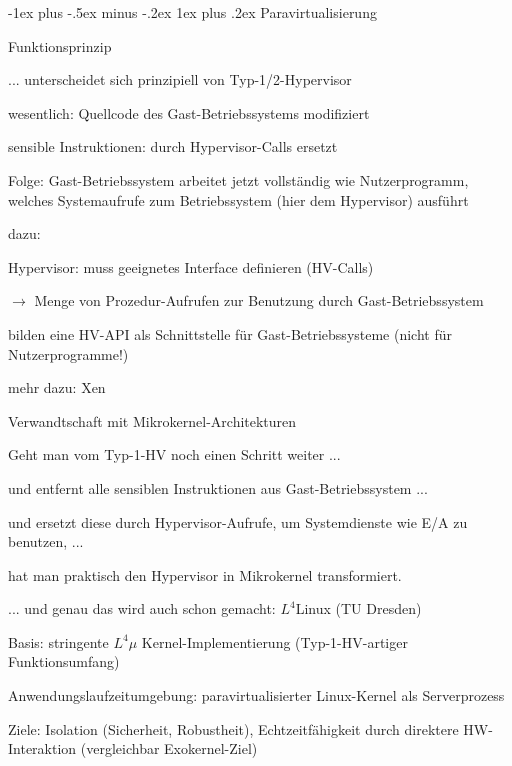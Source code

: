 \documentclass[a4paper]{article}
\makeatletter
\renewcommand{\subsubsection}{\@startsection{subsubsection}{3}{0mm}%
 {-1ex plus -.5ex minus -.2ex}%
 {1ex plus .2ex}%
 {\normalfont\small\bfseries}}
\makeatother
\begin{document}
\begin{multicols}{3}
    \subsubsection{Paravirtualisierung}

    Funktionsprinzip

    \begin{itemize*}
        \item
        ... unterscheidet sich prinzipiell von Typ-1/2-Hypervisor
        \item
        wesentlich: Quellcode des Gast-Betriebssystems modifiziert
        \item
        sensible Instruktionen: durch Hypervisor-Calls ersetzt
        \item
        Folge: Gast-Betriebssystem arbeitet jetzt vollständig wie
        Nutzerprogramm, welches Systemaufrufe zum Betriebssystem (hier dem
        Hypervisor) ausführt
        \item
        dazu:
        \begin{itemize*}
            \item Hypervisor: muss geeignetes Interface definieren (HV-Calls)
            \item[$\rightarrow$] Menge von Prozedur-Aufrufen zur Benutzung durch Gast-Betriebssystem
            \item bilden eine HV-API als Schnittstelle für Gast-Betriebssysteme (nicht für Nutzerprogramme!)
        \end{itemize*}
        \item
        mehr dazu: Xen
    \end{itemize*}

    Verwandtschaft mit Mikrokernel-Architekturen

    \begin{itemize*}
        \item
        Geht man vom Typ-1-HV noch einen Schritt weiter ...
        \begin{itemize*}
            \item und entfernt alle sensiblen Instruktionen aus Gast-Betriebssystem ...
            \item und ersetzt diese durch Hypervisor-Aufrufe, um Systemdienste wie E/A zu benutzen, ...
            \item hat man praktisch den Hypervisor in Mikrokernel transformiert.
        \end{itemize*}
        \item
        ... und genau das wird auch schon gemacht: $L^4$Linux (TU
        Dresden)
        \begin{itemize*}
            \item Basis: stringente $L^4\mu$ Kernel-Implementierung (Typ-1-HV-artiger Funktionsumfang)
            \item Anwendungslaufzeitumgebung: paravirtualisierter Linux-Kernel als Serverprozess
            \item Ziele: Isolation (Sicherheit, Robustheit), Echtzeitfähigkeit durch direktere HW-Interaktion (vergleichbar Exokernel-Ziel)
        \end{itemize*}
    \end{itemize*}


\end{multicols}
\end{document}
